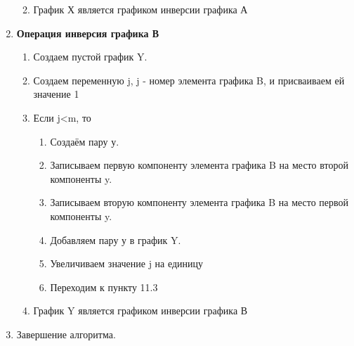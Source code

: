 \documentclass[a4paper,12pt]{extarticle}
\begin{document}
\begin{enumerate}
\begin{enumerate}[label*=\arabic*.]
\begin{enumerate}[label*=\arabic*.]
        \end{enumerate}
        \item График Х является графиком инверсии графика А
    \end{enumerate}
  \item \textbf{Операция инверсия графика В}
    \begin{enumerate}[label*=\arabic*.]
        \item Создаем пустой график Y.
        \item Создаем переменную j, j - номер элемента графика B, и присваиваем ей значение 1
        \item Если j<m, то
        \begin{enumerate}[label*=\arabic*.]
            \item Создаём пару у.
            \item Записываем первую компоненту элемента графика B на место второй компоненты y.
            \item Записываем вторую компоненту элемента графика B на место первой компоненты y.
            \item Добавляем пару у в график Y.
            \item Увеличиваем значение j на единицу
            \item Переходим к пункту 11.3
        \end{enumerate}
        \item График Y является графиком инверсии графика В
    \end{enumerate}
  \item Завершение алгоритма.
\end{enumerate}
\end{document}
